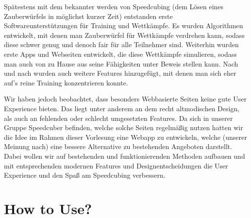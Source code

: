 \documentclass[a4paper]{article}
\theoremstyle{definition}
\begin{document}
Spätestens mit dem bekannter werden von Speedcubing (dem Lösen eines Zauberwürfels in möglichst kurzer Zeit)
entstanden erste Softwareunterstützungen für Training und Wettkämpfe. Es wurden Algorithmen entwickelt, mit denen
man Zauberwürfel für Wettkämpfe verdrehen kann, sodass diese schwer genug und denoch fair für alle Teilnehmer sind.
Weiterhin wurden erste Apps und Webseiten entwickelt, die diese Wettkämpfe simulieren, sodass man auch von zu
Hause aus seine Fähigkeiten unter Beweis stellen kann. Nach und nach wurden auch weitere Features hinzugefügt,
mit denen man sich eher auf's reine Training konzentrieren konnte.

Wir haben jedoch beobachtet, dass besonders Webbasierte Seiten keine gute User Experience bieten. Das liegt
unter anderem an dem recht altmodischen Design, als auch an fehlenden oder schlecht umgesetzten Features.
Da sich in unserer Gruppe Speedcuber befinden, welche solche Seiten regelmäßig nutzen hatten wir die Idee im
Rahmen dieser Vorlesung eine Webapp zu entwickeln, welche (unserer Meinung nach) eine bessere Alternative zu bestehenden
Angeboten darstellt. Dabei wollen wir auf bestehenden und funktionierenden Methoden aufbauen und mit entsprechenden
modernen Features und Designentscheidungen die User Experience und den Spaß am Speedcubing verbessern.

\section{How to Use?}
\end{document}
